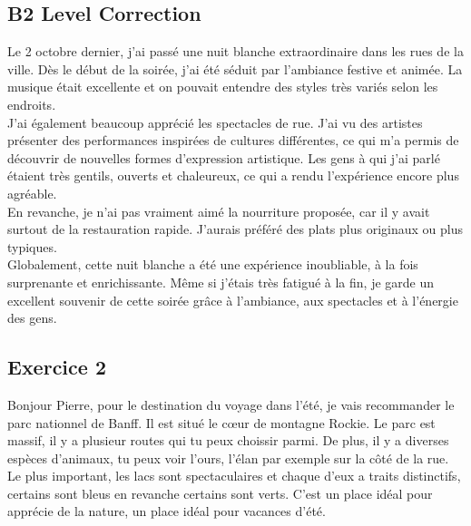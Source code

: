 \documentclass{book}
\begin{document}
        \subsection*{B2 Level Correction}
            Le 2 octobre dernier, j'ai passé une nuit blanche extraordinaire dans les rues de la ville. 
            Dès le début de la soirée, j'ai été séduit par l'ambiance festive et animée. La musique était excellente et on pouvait entendre des styles très variés selon les endroits.
            \\
            J'ai également beaucoup apprécié les spectacles de rue. J'ai vu des artistes présenter des performances inspirées de cultures différentes, ce qui m'a permis de découvrir de nouvelles formes d'expression artistique.
            Les gens à qui j'ai parlé étaient très gentils, ouverts et chaleureux, ce qui a rendu l'expérience encore plus agréable.
            \\
            En revanche, je n'ai pas vraiment aimé la nourriture proposée, car il y avait surtout de la restauration rapide.
            J'aurais préféré des plats plus originaux ou plus typiques.
            \\
            Globalement, cette nuit blanche a été une expérience inoubliable, à la fois surprenante et enrichissante. 
            Même si j'étais très fatigué à la fin, je garde un excellent souvenir de cette soirée grâce à l'ambiance, aux spectacles et à l'énergie des gens.
        \newpage
        \subsection{Exercice 2}
            Bonjour Pierre, pour le destination du voyage dans l'été, je vais recommander le parc nationnel de Banff. Il est situé le cœur de montagne Rockie.
            Le parc est massif, il y a plusieur routes qui tu peux choissir parmi. De plus, il y a diverses espèces d'animaux, tu peux voir l'ours, l'élan par exemple sur la côté de la rue.
            Le plus important, les lacs sont spectaculaires et chaque d'eux a traits distinctifs, certains sont bleus en revanche certains sont verts. 
            C'est un place idéal pour apprécie de la nature, un place idéal pour vacances d'été.
\end{document}
